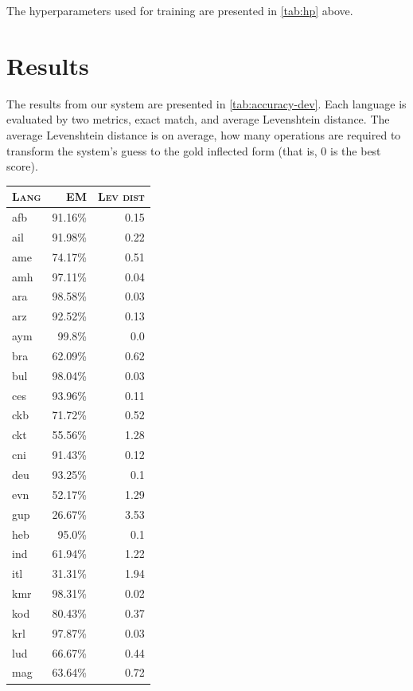 \documentclass[11pt,a4paper]{article}
\begin{document}
The hyperparameters used for training are presented in \cref{tab:hp} above.


\section{Results}


The results from our system are presented in
\cref{tab:accuracy-dev}. Each language is evaluated by two metrics,
exact match, and average Levenshtein distance. The average Levenshtein
distance is on average, how many operations are required to transform
the system's guess to the gold inflected form (that is, $0$ is the
best score).

\begin{table}[ht!]
\centering
\begin{tabular}{lrr}
\textsc{Lang} & \textsc{EM} & \textsc{Lev dist}  \\
  \hline
  afb & 91.16\% & 0.15 \\
  ail & 91.98\% & 0.22 \\
  ame & 74.17\% & 0.51 \\
  amh & 97.11\% & 0.04 \\
  ara & 98.58\% & 0.03 \\
  arz & 92.52\% & 0.13 \\
  aym & 99.8\% & 0.0 \\
  bra & 62.09\% & 0.62 \\
  bul & 98.04\% & 0.03 \\
  ces & 93.96\% & 0.11 \\
  ckb & 71.72\% & 0.52 \\
  ckt & 55.56\% & 1.28 \\
  cni & 91.43\% & 0.12 \\
  deu & 93.25\% & 0.1 \\
  evn & 52.17\% & 1.29 \\
  gup & 26.67\% & 3.53 \\
  heb & 95.0\% & 0.1 \\
  ind & 61.94\% & 1.22 \\
  itl & 31.31\% & 1.94 \\
  kmr & 98.31\% & 0.02 \\
  kod & 80.43\% & 0.37 \\
  krl & 97.87\% & 0.03 \\
  lud & 66.67\% & 0.44 \\
  mag & 63.64\% & 0.72 \\

\end{tabular}
\end{table}
\end{document}
